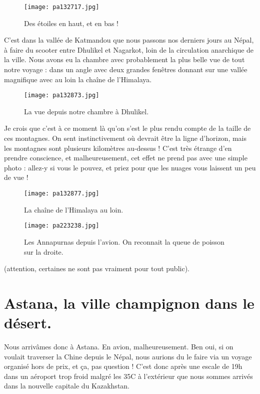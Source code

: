 \documentclass{book}
\begin{document}
\begin{figure}[h]
\centering
\texttt{[image: pa132717.jpg]}
\caption*{Des étoiles en haut, et en bas !}
\end{figure}

C'est dans la vallée de Katmandou que nous passons nos derniers jours au Népal, à faire du scooter entre Dhulikel et Nagarkot, loin de la circulation anarchique de la ville. Nous avons eu la chambre avec probablement la plus belle vue de tout notre voyage : dans un angle avec deux grandes fenêtres donnant sur une vallée magnifique avec au loin la chaîne de l'Himalaya.


\begin{figure}[h]
\centering
\texttt{[image: pa132873.jpg]}
\caption*{La vue depuis notre chambre à Dhulikel.}
\end{figure}

Je crois que c'est à ce moment là qu'on s'est le plus rendu compte de la taille de ces montagnes. On sent instinctivement où devrait être la ligne d'horizon, mais les montagnes sont plusieurs kilomètres au-dessus ! C'est très étrange d'en prendre conscience, et malheureusement, cet effet ne prend pas avec une simple photo : allez-y si vous le pouvez, et priez pour que les nuages vous laissent un peu de vue !


\begin{figure}[h]
\centering
\texttt{[image: pa132877.jpg]}
\caption*{La chaîne de l'Himalaya au loin.}
\end{figure}


\begin{figure}[h]
\centering
\texttt{[image: pa223238.jpg]}
\caption*{Les Annapurnas depuis l'avion. On reconnait la queue de poisson sur la droite.}
\end{figure}

 (attention, certaines ne sont pas vraiment pour tout public).

\chapter{Astana, la ville champignon dans le désert.}
Nous arrivâmes donc à Astana. En avion, malheureusement. Ben oui, si on voulait traverser la Chine depuis le Népal, nous aurions du le faire via un voyage organisé hors de prix, et ça, pas question ! C'est donc après une escale de 19h dans un aéroport trop froid malgré les 35\textdegree C à l'extérieur que nous sommes arrivés dans la nouvelle capitale du Kazakhstan.
\end{document}
